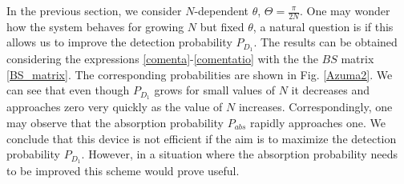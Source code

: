 \documentclass[12pt]{book}
\begin{document}
In the previous section, we consider $N$-dependent $\theta$, $\Theta = \frac{\pi}{2N}$. One may wonder how the system behaves for growing $N$ but fixed $\theta$, a natural question is if this allows us to improve the detection probability $P_{D_{1}}$. The results can be obtained considering the expressions \ref{comenta}-\ref{comentatio} with the the $BS$ matrix \ref{BS_matrix}. The corresponding probabilities are shown in Fig. \ref{Azuma2}. We can see that even though $P_{D_{1}}$ grows for small values of $N$ it decreases and approaches zero very quickly as the value of $N$ increases. Correspondingly, one may observe that the absorption probability $P_{abs}$ rapidly approaches one. We conclude that this device is not efficient if the aim is to maximize the detection probability $P_{D_{1}}$. However, in a situation where the absorption probability needs to be improved this scheme would prove useful.
\end{document}
